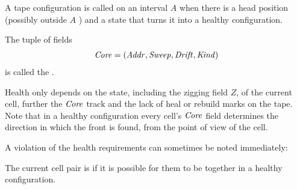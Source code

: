 \documentclass[11pt]{memoir}
\theoremstyle{definition} %
\newcommand{\fld}[1]{\ensuremath{\textit{#1\/}}}
\newcommand{\Z}{Z}
\newcommand{\Addr}{\fld{Addr}}
\newcommand{\Core}{\fld{Core}}
\newcommand{\Drift}{\fld{Drift}}
\newcommand{\Kind}{\fld{Kind}}
\newcommand{\Sweep}{\fld{Sweep}}
\newcommand{\front}{\mathrm{front}}
\newcommand{\Last}{\mathrm{Last}}
\newcommand{\TransferSw}{\mathrm{TransferSw}}
\begin{document}
        





A tape configuration is called  on an interval \( A \)
when there is a head position (possibly outside \( A \) ) and a 
state that turns it into a healthy configuration.

 \begin{definition}
The tuple of fields
\begin{align*}
   \Core =(\Addr, \Sweep, \Drift, \Kind)
 \end{align*}
is called the .   
 \end{definition}

Health only depends on the state, including the 
zigging field \( \Z \), of the current cell, further the  \( \Core \) track
and the lack of heal or rebuild marks on the tape.
Note that in a healthy configuration every cell's \( \Core \) field
determines the direction in which the front is found, from the point of
view of the cell.

A violation of the health requirements can sometimes be noted immediately:

\begin{definition}[Coordination] \label{def:coordinated}
   The current cell pair is  
   if it is possible for them to be together in a healthy configuration.
\end{definition}
\end{document}

